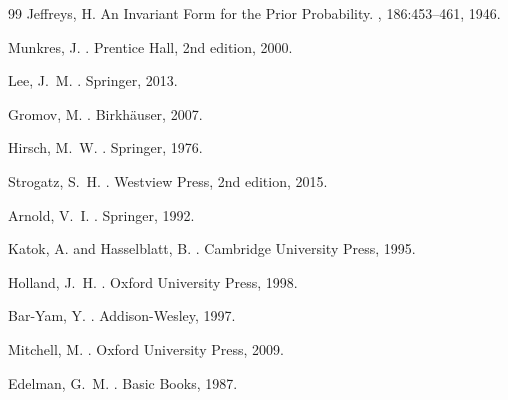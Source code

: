 \documentclass[12pt,twoside,openright]{book}
\begin{document}
\begin{thebibliography}{99}
Jeffreys, H.
\newblock An Invariant Form for the Prior Probability.
,
  186:453--461, 1946.


Munkres, J.
.
\newblock Prentice Hall, 2nd edition, 2000.

Lee, J.~M.
.
\newblock Springer, 2013.

Gromov, M.
.
\newblock Birkh\"{a}user, 2007.

Hirsch, M.~W.
.
\newblock Springer, 1976.


Strogatz, S.~H.
.
\newblock Westview Press, 2nd edition, 2015.

Arnold, V.~I.
.
\newblock Springer, 1992.

Katok, A. and Hasselblatt, B.
.
\newblock Cambridge University Press, 1995.


Holland, J.~H.
.
\newblock Oxford University Press, 1998.

Bar-Yam, Y.
.
\newblock Addison-Wesley, 1997.

Mitchell, M.
.
\newblock Oxford University Press, 2009.


Edelman, G.~M.
.
\newblock Basic Books, 1987.


\end{thebibliography}
\end{document}
